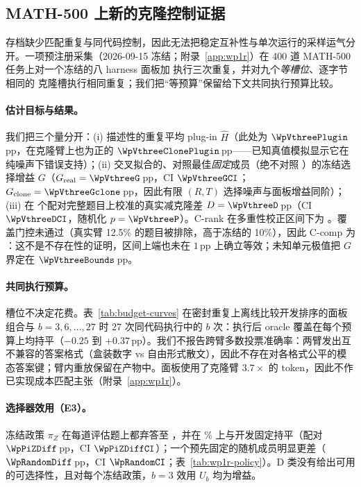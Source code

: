 
\subsection{MATH-500 上新的克隆控制证据}\label{sec:wp1r}

存档缺少匹配重复与同代码控制，因此无法把稳定互补性与单次运行的采样运气分开。一项预注册采集（2026-09-15 冻结；附录~\ref{app:wp1r}）在 400 道 MATH-500 任务上对一个冻结的八 harness 面板加 \bare{} 执行三次重复，并对九个\emph{等槽位}、逐字节相同的 \bare{} 克隆槽执行相同重复；我们把“等预算”保留给下文共同执行预算比较。

\paragraph{估计目标与结果。}
我们把三个量分开：(i) 描述性的重复平均 plug-in $\widehat H$（此处为 $\WpVthreePlugin$\,pp，在克隆臂上也为正的 $\WpVthreeClonePlugin$\,pp——已知真值模拟显示它在纯噪声下错误支持）；(ii) 交叉拟合的、对照最佳\emph{固定}成员（绝不对照 \bare{}）的冻结选择增益 $G$（$G_{\rm real}=\WpVthreeG$\,pp，CI $\WpVthreeGCI$；$G_{\rm clone}=\WpVthreeGclone$\,pp，因此有限 $(R,T)$ 选择噪声与面板增益同阶）；(iii) 在 \WpVthreeNPaired{} 个配对完整题目上校准的真实减克隆差 $D=\WpVthreeD$\,pp（CI $\WpVthreeDCI$，随机化 $p=\WpVthreeP$）。C-rank 在多重性校正区间下为 \textsc{\WpCrankState}。覆盖门控未通过（真实臂 12.5\% 的题目被排除，高于冻结的 10\%），因此 C-comp 为 \textsc{\WpVthreeState}：这不是不存在性的证明，区间上端也未在 $1$\,pp 上确立等效；未知单元极值把 $G$ 界定在 $\WpVthreeBounds$\,pp。

\paragraph{共同执行预算。}
槽位不决定花费。表~\ref{tab:budget-curves} 在密封重复上离线比较开发排序的面板组合与 $b=3,6,\ldots,27$ 时 27 次同代码执行中的 $b$ 次：执行后 oracle 覆盖在每个预算上均持平（$-0.25$ 到 $+0.37$\,pp）。我们不报告跨臂多数投票准确率：两臂发出互不兼容的答案格式（盒装数字 vs 自由形式散文），因此不存在对各格式公平的模态答案键；臂内重放保留在产物中。面板使用了克隆臂 $3.7\times$ 的 token，因此不作已实现成本匹配主张（附录~\ref{app:wp1r}）。

\begin{table}[t]
\centering\small

\caption{\textbf{共同逐任务执行预算，对密封 MATH-500 重复的离线重放。}开发排序面板组合与 27 次同代码 \bare{} 执行中的 $b$ 次的执行后 oracle 覆盖（最佳官方判定结果，是需要事后验证器的上界）（1{,}000 个带种子子集；95\% 范围在 $0.3$\,pp 内）。不报告跨臂多数投票准确率，因为两臂使用互不兼容的答案格式（附录~\ref{app:wp1r}）。}
\label{tab:budget-curves}
\end{table}

\paragraph{选择器效用（E3）。}冻结政策 $\pi_Z$ 在每道评估题上都弃答至 \bare{}，并在 \WpBareAcc\% 上与开发固定持平（配对 $\WpPiZDiff$\,pp，CI $\WpPiZDiffCI$）；一个预先固定的随机成员明显更差（$\WpRandomDiff$\,pp，CI $\WpRandomCI$；表~\ref{tab:wp1r-policy}）。D 类没有给出可用的可选择性，且对每个冻结政策，$b{=}3$ 效用 $U_b$ 均为\WpEbZero{}增益。
